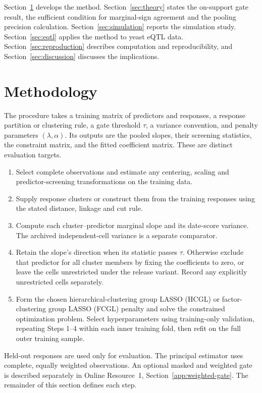 \documentclass[lineno,pdflatex,sn-basic]{sn-jnl}
\theoremstyle{thmstyleone}
\begin{document}
Section~\ref{sec:methods} develops the method. Section~\ref{sec:theory} states the
on-support gate result, the sufficient condition for marginal-sign agreement
and the pooling precision calculation. Section~\ref{sec:simulation} reports the
simulation study. Section~\ref{sec:eqtl} applies the method to yeast eQTL data.
Section~\ref{sec:reproduction} describes computation and reproducibility, and
Section~\ref{sec:discussion} discusses the implications.
\FloatBarrier
\section{Methodology} \label{sec:methods}

The procedure takes a training matrix of predictors and responses, a response
partition or clustering rule, a gate threshold $\tau$, a variance convention,
and penalty parameters $(\lambda,\alpha)$. Its outputs are
the pooled slopes, their screening statistics, the constraint matrix, and the
fitted coefficient matrix. These are distinct evaluation targets.
\begin{enumerate}
	\item Select complete observations and estimate any
	centering, scaling and predictor-screening transformations on the training data.
	\item Supply response clusters or construct them from the training responses
	using the stated distance, linkage and cut rule.
	\item Compute each cluster--predictor marginal slope and its date-score
	variance. The archived independent-cell variance is a separate comparator.
	\item Retain the slope's direction when its statistic passes $\tau$. Otherwise
	exclude that predictor for all cluster members by fixing the coefficients to
	zero, or leave the cells unrestricted under the release variant. Record any
	explicitly unrestricted cells separately.
	\item Form the chosen hierarchical-clustering group LASSO (HCGL) or
	factor-clustering group LASSO (FCGL) penalty and solve the constrained
	optimization problem. Select hyperparameters using training-only validation,
	repeating Steps 1--4 within each inner training fold, then refit on the full
	outer training sample.
\end{enumerate}
Held-out responses are used only for evaluation. The principal estimator uses
complete, equally weighted observations. An optional masked and weighted gate
is described separately in Online Resource~1, Section~\ref{app:weighted-gate}.
The remainder of this section defines each step.
\end{document}
